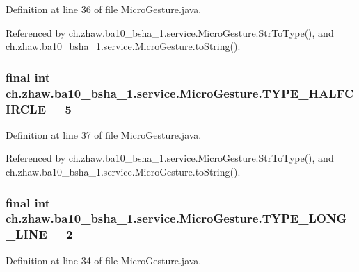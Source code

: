 Definition at line 36 of file MicroGesture.java.

Referenced by ch.zhaw.ba10\_\-bsha\_\-1.service.MicroGesture.StrToType(), and ch.zhaw.ba10\_\-bsha\_\-1.service.MicroGesture.toString().\hypertarget{classch_1_1zhaw_1_1ba10__bsha__1_1_1service_1_1MicroGesture_aa2babf7288fba5f44c2fd20f29f49386}{
\subsubsection[{TYPE\_\-HALFCIRCLE}]{\setlength{\rightskip}{0pt plus 5cm}final int {\bf ch.zhaw.ba10\_\-bsha\_\-1.service.MicroGesture.TYPE\_\-HALFCIRCLE} = 5}}
\label{classch_1_1zhaw_1_1ba10__bsha__1_1_1service_1_1MicroGesture_aa2babf7288fba5f44c2fd20f29f49386}


Definition at line 37 of file MicroGesture.java.

Referenced by ch.zhaw.ba10\_\-bsha\_\-1.service.MicroGesture.StrToType(), and ch.zhaw.ba10\_\-bsha\_\-1.service.MicroGesture.toString().\hypertarget{classch_1_1zhaw_1_1ba10__bsha__1_1_1service_1_1MicroGesture_a7aa282efbebb6c0ed0fcce9ad05f0769}{
\subsubsection[{TYPE\_\-LONG\_\-LINE}]{\setlength{\rightskip}{0pt plus 5cm}final int {\bf ch.zhaw.ba10\_\-bsha\_\-1.service.MicroGesture.TYPE\_\-LONG\_\-LINE} = 2}}
\label{classch_1_1zhaw_1_1ba10__bsha__1_1_1service_1_1MicroGesture_a7aa282efbebb6c0ed0fcce9ad05f0769}


Definition at line 34 of file MicroGesture.java.

